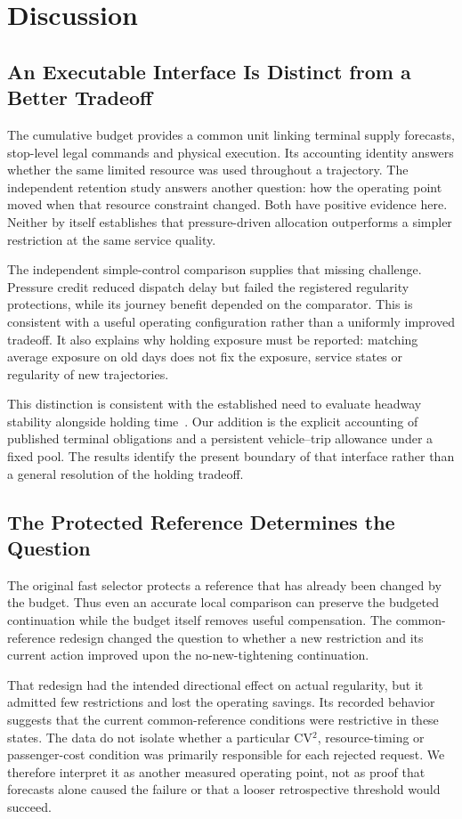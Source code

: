 \section{Discussion}
\subsection{An Executable Interface Is Distinct from a Better Tradeoff}
The cumulative budget provides a common unit linking terminal supply forecasts, stop-level legal commands and physical execution. Its accounting identity answers whether the same limited resource was used throughout a trajectory. The independent retention study answers another question: how the operating point moved when that resource constraint changed. Both have positive evidence here. Neither by itself establishes that pressure-driven allocation outperforms a simpler restriction at the same service quality.

The independent simple-control comparison supplies that missing challenge. Pressure credit reduced dispatch delay but failed the registered regularity protections, while its journey benefit depended on the comparator. This is consistent with a useful operating configuration rather than a uniformly improved tradeoff. It also explains why holding exposure must be reported: matching average exposure on old days does not fix the exposure, service states or regularity of new trajectories.

This distinction is consistent with the established need to evaluate headway stability alongside holding time~\cite{berrebi2018comparing}. Our addition is the explicit accounting of published terminal obligations and a persistent vehicle--trip allowance under a fixed pool. The results identify the present boundary of that interface rather than a general resolution of the holding tradeoff.

\subsection{The Protected Reference Determines the Question}
The original fast selector protects a reference that has already been changed by the budget. Thus even an accurate local comparison can preserve the budgeted continuation while the budget itself removes useful compensation. The common-reference redesign changed the question to whether a new restriction and its current action improved upon the no-new-tightening continuation.

That redesign had the intended directional effect on actual regularity, but it admitted few restrictions and lost the operating savings. Its recorded behavior suggests that the current common-reference conditions were restrictive in these states. The data do not isolate whether a particular CV$^2$, resource-timing or passenger-cost condition was primarily responsible for each rejected request. We therefore interpret it as another measured operating point, not as proof that forecasts alone caused the failure or that a looser retrospective threshold would succeed.

